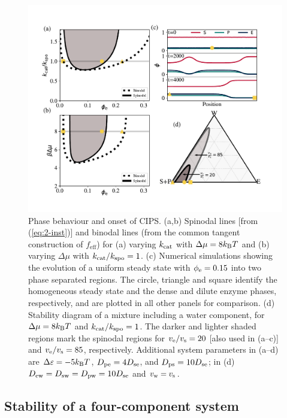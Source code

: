 \begin{figure}
    \centering
    \includegraphics[width=\textwidth]{figures/2-cips-figs/CIPSphase.pdf}
    \caption{Phase behaviour and onset of CIPS. (a,b) Spinodal lines [from (\ref{eq:2-inst})] and binodal lines (from the common tangent construction of $f_\mathrm{eff}$) for (a) varying $k_{\mathrm{cat}}$ with $\Delta\mu=8 k_{\rm B} T$ and (b) varying $\Delta \mu$ with $k_{\mathrm{cat}}/k_{\mathrm{spo}}=1$. (c) Numerical simulations showing the evolution of a uniform steady state with $\phi_{\mathrm{e}}=0.15$ into two phase separated regions. The circle, triangle and square identify the homogeneous steady state and the dense and dilute enzyme phases, respectively, and are plotted in all other panels for comparison. (d) Stability diagram of a mixture including a water component, for $\Delta\mu=8 k_{\rm B} T$ and $k_{\mathrm{cat}}/k_{\mathrm{spo}}=1$. The darker and lighter shaded regions mark the spinodal regions for $v_{\mathrm{e}}/v_{\mathrm{s}}=20$ [also used in (a--c)] and $v_{\mathrm{e}}/v_{\mathrm{s}}=85$, respectively. Additional system parameters in (a--d) are $\Delta \varepsilon=-5 k_{\rm B} T$, $D_{\mathrm{pe}}=4 D_{\mathrm{se}}$, and $D_{\mathrm{ps}}=10 D_{\mathrm{se}}$; in (d) $D_{\mathrm{ew}}=D_{\mathrm{sw}}=D_{\mathrm{pw}}=10 D_{\mathrm{se}}$ and $v_{\mathrm{w}}=v_{\mathrm{s}}$.}
    \label{fig:CIPSphase}
\end{figure}

\subsection{Stability of a four-component system}

